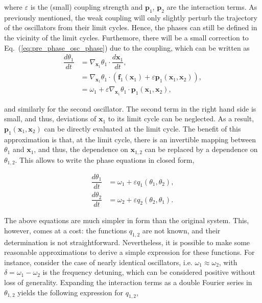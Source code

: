 \noindent where $\varepsilon$ is the (small) coupling strength and $\mathbf{p}_1$, $\mathbf{p}_2$ are the interaction terms.
As previously mentioned, the weak coupling will only slightly perturb the trajectory of the oscillators
from their limit cycles. Hence, the phases can still be defined in the vicinity of the limit cycles. Furthemore,
there will be a small correction to Eq.~(\ref{eq:pre_phase_osc_phase}) due to the coupling, which can be written as
\begin{align}
    \dfrac{d\theta_1}{dt} &= \nabla_{\mathbf{x}_1} \theta_1 \cdot \dfrac{d\mathbf{x}_1}{dt}, \nonumber \\
                    &= \nabla_{\mathbf{x}_1} \theta_1 \cdot (\mathbf{f}_1(\mathbf{x}_1) + \varepsilon \mathbf{p}_1(\mathbf{x}_1, \mathbf{x}_2)), \nonumber \\
                    &= \omega_1 + \varepsilon \nabla_{\mathbf{x}_1} \theta_1 \cdot \mathbf{p}_1(\mathbf{x}_1, \mathbf{x}_2),
\end{align}

\noindent and similarly for the second oscillator. The second term in the right hand side is small, and thus, deviations
of $\mathbf{x}_1$ to its limit cycle can be neglected. As a result, $\mathbf{p}_1(\mathbf{x}_1, \mathbf{x}_2)$ can be directly
evaluated at the limit cycle. The benefit of this approximation is that, at the limit cycle, there is
an invertible mapping between $\theta_1$ and $\mathbf{x}_1$, and thus, the dependence on $\mathbf{x}_{1,2}$
can be replaced by a dependence on $\theta_{1,2}$. This allows to write the phase equations in closed form,

\begin{align}
    \dfrac{d\theta_1}{dt} &= \omega_1 + \varepsilon q_1(\theta_1, \theta_2), \\
    \dfrac{d\theta_2}{dt} &= \omega_2 + \varepsilon q_2(\theta_2, \theta_1).
\end{align}

The above equations are much simpler in form than the original system. This, however, comes at a cost: 
the functions $q_{1,2}$ are not known, and their determination is not straightforward. Nevertheless,
it is possible to make some reasonable approximations to derive a simple expression for these functions.
For instance, consider the case of nearly identical oscillators, i.e. $\omega_1 \approx \omega_2$,
with $\delta = \omega_1 - \omega_2$ is the frequency detuning, which can be considered positive
without loss of generality. Expanding the interaction terms as a double Fourier
series in $\theta_{1,2}$ yields the following expression for $q_{1,2}$,

